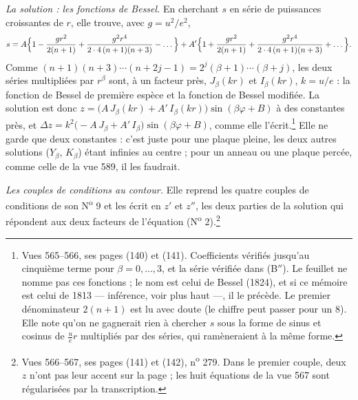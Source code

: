 \documentclass[11pt,a4paper]{article}
\begin{document}
\emph{La solution : les fonctions de Bessel.} En cherchant $s$ en série de
puissances croissantes de $r$, elle trouve, avec $g = u^2/e^2$,
\[
s = A\Bigl\{1 - \frac{g r^2}{2(n+1)} + \frac{g^2 r^4}{2\cdot4\,(n+1)(n+3)} - \dots\Bigr\}
+ A'\Bigl\{1 + \frac{g r^2}{2(n+1)} + \frac{g^2 r^4}{2\cdot4\,(n+1)(n+3)} + \dots\Bigr\}.
\]
Comme $(n+1)(n+3)\cdots(n+2j-1) = 2^j(\beta+1)\cdots(\beta+j)$, les deux séries
multipliées par $r^\beta$ sont, à un facteur près, $J_\beta(kr)$ et $I_\beta(kr)$,
$k = u/e$ : la fonction de Bessel de première espèce et la fonction de Bessel
modifiée. La solution est donc $z = \bigl(A\,J_\beta(kr) + A'\,I_\beta(kr)\bigr)
\sin(\beta\varphi + B)$ à des constantes près, et
$\Delta z = k^2\bigl(-A\,J_\beta + A'\,I_\beta\bigr)\sin(\beta\varphi+B)$, comme
elle l'écrit.\footnote{Vues 565--566, ses pages (140) et (141). Coefficients
vérifiés jusqu'au cinquième terme pour $\beta = 0, \dots, 3$, et la série
vérifiée dans (B$''$). Le feuillet ne nomme pas ces fonctions ; le nom est celui
de Bessel (1824), et si ce mémoire est celui de 1813 — inférence, voir plus
haut —, il le précède. Le premier dénominateur $2(n+1)$ est lu avec doute (le
chiffre peut passer pour un 8). Elle note qu'on ne gagnerait rien à chercher
$s$ sous la forme de sinus et cosinus de $\frac{u}{e}r$ multipliés par des
séries, qui ramèneraient à la même forme.} Elle ne garde que deux constantes :
c'est juste pour une plaque pleine, les deux autres solutions ($Y_\beta$,
$K_\beta$) étant infinies au centre ; pour un anneau ou une plaque percée,
comme celle de la vue 589, il les faudrait.

\emph{Les couples de conditions au contour.} Elle reprend les quatre couples de
conditions de son N\textsuperscript{o} 9 et les écrit en $z'$ et $z''$, les deux
parties de la solution qui répondent aux deux facteurs de l'équation
(N\textsuperscript{o} 2).\footnote{Vues 566--567, ses pages (141) et (142),
n\textsuperscript{o} 279. Dans le premier couple, deux $z$ n'ont pas leur accent
sur la page ; les huit équations de la vue 567 sont régularisées par la
transcription.}
\end{document}
